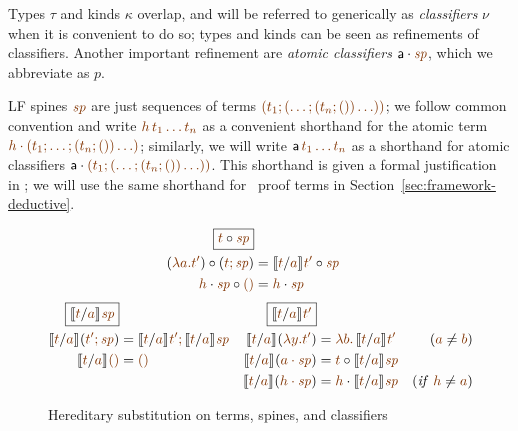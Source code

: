 \noindent
Types $\tau$ and kinds $\kappa$ overlap, and will be referred to
generically as {\it classifiers} $\nu$ when it is convenient to do so;
types and kinds can be seen as refinements of classifiers. Another
important refinement are {\it atomic classifiers} $\lfroot{\sf
  a}{\spi}$, which we abbreviate as $p$.

LF spines $\lf\spi$ are just sequences of terms $\lf{(t_1; (\ldots;
  (t_n;())\ldots))}$; we follow common convention and write
$\lf{h\,t_1\ldots t_n}$ as a convenient shorthand for the atomic term
$\lf{\lfroot{h}{(t_1; \ldots; (t_n;())\ldots)}}$; similarly, we will
write ${\sf a}\,\lf{t_1\ldots t_n}$ as a shorthand for atomic
classifiers $\lfroot{\sf a}{(t_1;
  (\ldots; (t_n;())\ldots))}$. This shorthand is given a formal justification
in \cite{cervesato02linear}; we will use the same shorthand for 
\sls~proof terms in Section~\ref{sec:framework-deductive}.


\begin{figure}[t]
\begin{align*}
\fbox{$\subst{\lf{t}}{\lf{\spi}}$}
\\
\subst{(\lf{\lambda a. t'})}{(\lf{t; \spi})}
 & = \subst{\rsubst{\lf{t}}{\lf{a}}{\lf{t'}}}{\lf{\spi}}
\\
\subst{\lfroot{\lf h}{\spi}}{\lfnil}
 & = \lfroot{\lf h}{\spi}
\end{align*}\begin{align*}
\fbox{$\rsubst{\lf{t}}{\lf{a}}{\lf{\spi}}$}&
&
\fbox{$\rsubst{\lf{t}}{\lf{a}}{\lf{t'}}$}&
&
\\
\rsubst{\lf t}{\lf a}{(\lf{t'; \spi})}
 & = \lf{\no{\rsubst{\lf t}{\lf a}{\lf{t'}}}; 
         \no{\rsubst{\lf t}{\lf a}{\lf{\spi}}}} &
\rsubst{\lf t}{\lf a}(\lf{\lambda y. t'})
 & = \lf{\lambda b.\, \no{\rsubst{\lf t}{\lf a}{\lf{t'}}}} 
      & (\lf a \neq \lf b) 
\\
\rsubst{\lf t}{\lf a}{\lfnil} 
 & = \lfnil &
\rsubst{\lf t}{\lf a}{(\lf{\lfroot{a}{\spi}})}
 & = \subst{\lf t}{\rsubst{\lf t}{\lf a}{\lf{\spi}}}
\\
& & 
\rsubst{\lf t}{\lf a}{(\lf{\lfroot{h}{\spi}})}
 & = \lfroot{\lf h}{\no{\rsubst{\lf t}{\lf a}{\lf{\spi}}}}
      & ({\it if}~ \lf{h} \neq \lf{a})
\end{align*}
\caption{Hereditary substitution on terms, spines, and classifiers}
\label{fig:lf-hsubst}
\end{figure}

